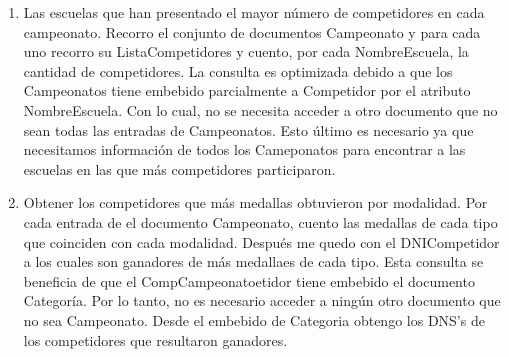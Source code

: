 \begin{enumerate}
\item Las escuelas que han presentado el mayor número de competidores en cada campeonato. Recorro el conjunto de documentos
Campeonato y para cada uno recorro su ListaCompetidores y cuento, por cada NombreEscuela, la cantidad de competidores.
La consulta es optimizada debido a que los Campeonatos tiene embebido parcialmente a Competidor por el atributo
NombreEscuela. Con lo cual, no se necesita acceder a otro documento que no sean todas las entradas de Campeonatos.
Esto último es necesario ya que necesitamos información de todos los Cameponatos para encontrar a las escuelas en las
que más competidores participaron.

\item Obtener los competidores que más medallas obtuvieron por modalidad. Por cada entrada de el documento Campeonato,
cuento las medallas de cada tipo que coinciden con cada modalidad. Después me quedo con el DNICompetidor a los cuales
son ganadores de más medallaes de cada tipo. Esta consulta se beneficia de que el CompCampeonatoetidor tiene embebido
el documento Categoría. Por lo tanto, no es necesario acceder a ningún otro documento que no sea Campeonato. Desde el embebido
 de Categoria obtengo los DNS's de los competidores que resultaron ganadores.

\end{enumerate}
